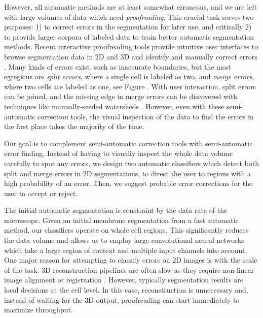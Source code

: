 However, all automatic methods are at least somewhat erroneous, and we are left with large volumes of data which need \emph{proofreading}. This crucial task serves two purposes: 1) to correct errors in the segmentation for later use, and critically 2) to provide larger corpora of labeled data to train better automatic segmentation methods. Recent interactive proofreading tools provide intuitive user interfaces to browse segmentation data in 2D and 3D and identify and manually correct errors \cite{markus_proofreading,raveler,mojo2,haehn_dojo_2014}. Many kinds of errors exist, such as inaccurate boundaries, but the most egregious are \emph{split errors}, where a single cell is labeled as two, and \emph{merge errors}, where two cells are labeled as one, see Figure . With user interaction, split errors can be joined, and the missing edge in merge errors can be discovered with techniques like manually-seeded watersheds \cite{haehn_dojo_2014}. However, even with these semi-automatic correction tools, the visual inspection of the data to find the errors in the first place takes the majority of the time.

Our goal is to complement semi-automatic correction tools with semi-automatic error finding. Instead of having to visually inspect the whole data volume carefully to spot any errors, we design two automatic classifiers which detect both split and merge errors in 2D segmentations, to direct the user to regions with a high probability of an error. Then, we suggest probable error corrections for the user to accept or reject. 

The initial automatic segmentation is constraint by the data rate of the microscope. Given an initial membrane segmentation from a fast automatic method, our classifiers operate on whole cell regions. This significantly reduces the data volume and allows us to employ large convolutional neural networks which take a large region of context and multiple input channels into account.
One major reason for attempting to classify errors on 2D images is with the scale of the task. 3D reconstruction pipelines are often slow as they require non-linear image alignment or registration \cite{akselrod09,beyer13,Saalfeld2010Asrigidaspossible}. However, typically segmentation results are local decisions at the cell level. In this case, reconstruction is unnecessary and, instead of waiting for the 3D output, proofreading can start immediately to maximize throughput.

